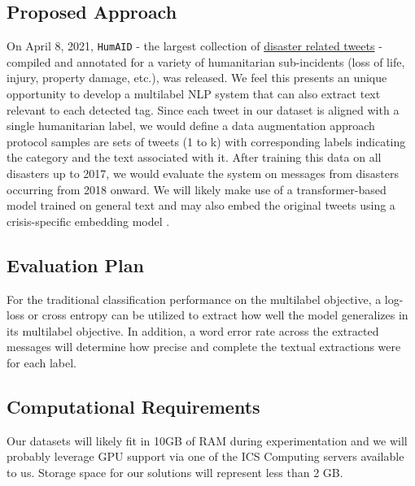 \documentclass[11pt,a4paper]{article}
\begin{document}
\subsection{Proposed Approach}
On April 8, 2021, \texttt{HumAID} \cite{humaid2020} - the largest collection of \href{https://crisisnlp.qcri.org/humaid_dataset}{disaster related tweets} - compiled and annotated for a variety of humanitarian sub-incidents (loss of life, injury, property damage, etc.), was released. We feel this presents an unique opportunity to develop a multilabel NLP system that can also extract text relevant to each detected tag. Since each tweet in our dataset is aligned with a single humanitarian label, we would define a data augmentation approach protocol samples are sets of tweets (1 to k) with corresponding labels indicating the category and the text associated with it. After training this data on all disasters up to 2017, we would evaluate the system on messages from disasters occurring from 2018 onward. We will likely make use of a transformer-based model trained on general text and may also embed the original tweets using a crisis-specific embedding model \cite{nguyen2017robust}.

\subsection{Evaluation Plan}
For the traditional classification performance on the multilabel objective, a log-loss or cross entropy can be utilized to extract how well the model generalizes in its multilabel objective. In addition, a word error rate across the extracted messages will determine how precise and complete the textual extractions were for each label.

\subsection{Computational Requirements}
Our datasets will likely fit in 10GB of RAM during experimentation and we will probably leverage GPU support via one of the ICS Computing servers available to us. Storage space for our solutions will represent less than 2 GB.






\appendix
\end{document}

